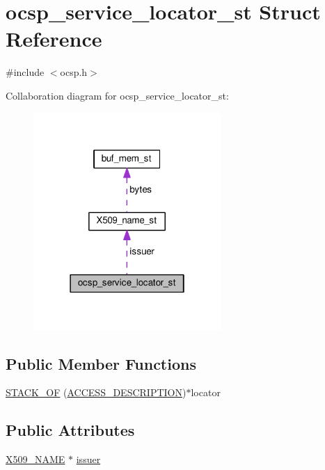\hypertarget{structocsp__service__locator__st}{}\section{ocsp\+\_\+service\+\_\+locator\+\_\+st Struct Reference}
\label{structocsp__service__locator__st}


{\ttfamily \#include $<$ocsp.\+h$>$}



Collaboration diagram for ocsp\+\_\+service\+\_\+locator\+\_\+st\+:
\nopagebreak
\begin{figure}[H]
\begin{center}
\leavevmode
\includegraphics[width=202pt]{structocsp__service__locator__st__coll__graph}
\end{center}
\end{figure}
\subsection*{Public Member Functions}
\begin{DoxyCompactItemize}
\item 
\hyperlink{structocsp__service__locator__st_a40440677d41058a84492d23ff4d56e8d}{S\+T\+A\+C\+K\+\_\+\+OF} (\hyperlink{x509v3_8h_a200fc9025d040a011250049a94c4bac4}{A\+C\+C\+E\+S\+S\+\_\+\+D\+E\+S\+C\+R\+I\+P\+T\+I\+ON})$\ast$locator
\end{DoxyCompactItemize}
\subsection*{Public Attributes}
\begin{DoxyCompactItemize}
\item 
\hyperlink{ossl__typ_8h_a5c5fc036757e87b9bd163d0221696533}{X509\+\_\+\+N\+A\+ME} $\ast$ \hyperlink{structocsp__service__locator__st_a223e62f217b2c10dd2502284591296ab}{issuer}
\end{DoxyCompactItemize}


